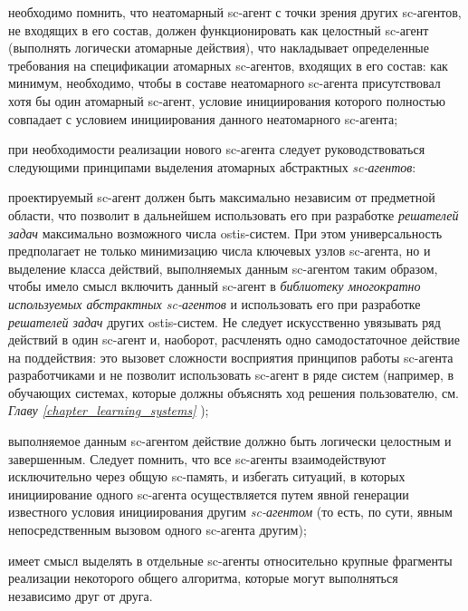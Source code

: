 \begin{textitemize}
\item необходимо помнить, что неатомарный sc-агент с точки зрения других sc-агентов, не входящих в его состав, должен функционировать как целостный sc-агент (выполнять логически атомарные действия), что накладывает определенные требования на спецификации атомарных sc-агентов, входящих в его состав: как минимум, необходимо, чтобы в составе неатомарного sc-агента присутствовал хотя бы один атомарный sc-агент, условие инициирования которого полностью совпадает с условием инициирования данного неатомарного sc-агента;
\item при необходимости реализации нового sc-агента следует руководствоваться следующими принципами выделения атомарных абстрактных \textit{sc-агентов}:

\begin{textitemize}
    \item проектируемый sc-агент должен быть максимально независим от предметной области, что позволит в дальнейшем использовать его при разработке \textit{решателей задач} максимально возможного числа ostis-систем. При этом универсальность предполагает не только минимизацию числа ключевых узлов sc-агента, но и выделение класса действий, выполняемых данным sc-агентом таким образом, чтобы имело смысл включить данный sc-агент в \textit{библиотеку многократно используемых абстрактных sc-агентов} и использовать его при разработке \textit{решателей задач} других ostis-систем. Не следует искусственно увязывать ряд действий в один sc-агент и, наоборот, расчленять одно самодостаточное действие на поддействия: это вызовет сложности восприятия принципов работы sc-агента разработчиками и не позволит использовать sc-агент в ряде систем (например, в обучающих системах, которые должны объяснять ход решения пользователю, см. \textit{Главу \ref{chapter_learning_systems} });
    \item выполняемое данным sc-агентом действие должно быть логически целостным и завершенным. Следует помнить, что все sc-агенты взаимодействуют исключительно через общую sc-память, и избегать ситуаций, в которых инициирование одного sc-агента осуществляется путем явной генерации известного условия инициирования другим \textit{sc-агентом} (то есть, по сути, явным непосредственным вызовом одного sc-агента другим);
    \item имеет смысл выделять в отдельные sc-агенты относительно крупные фрагменты реализации некоторого общего алгоритма, которые могут выполняться независимо друг от друга.
\end{textitemize}


\end{textitemize}
